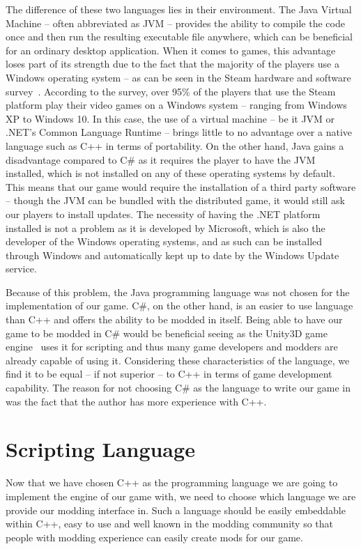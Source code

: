 The difference of these two languages lies in their environment. The Java Virtual Machine -- often abbreviated as JVM -- provides
the ability to compile the code once and then run the resulting executable file anywhere, which can be beneficial for an ordinary
desktop application. When it comes to games, this advantage loses part of its strength due to the fact that the majority of the
players use a Windows operating system -- as can be seen in the Steam hardware and software survey~\cite{SteamHW}. According
to the survey, over 95\% of the players that use the Steam platform  play their video games on a Windows system -- ranging
from Windows XP to Windows 10. In this case, the use of a virtual machine -- be it JVM or .NET's Common Language Runtime -- brings
little to no advantage over a native language such as C++ in terms of portability. On the other hand, Java gains a disadvantage
compared to C\# as it requires the player to have the JVM installed, which is not installed on any of these operating systems
by default. This means that our game would require the installation of a third party software -- though the JVM can be bundled
with the distributed game, it would still ask our players to install updates. The necessity of having the .NET platform
installed is not a problem as it is developed by Microsoft,
which is also the developer of the Windows operating systems, and as such can be installed through Windows and automatically kept
up to date by the Windows Update service.

Because of this problem, the Java programming language was not chosen for the implementation of our game. C\#, on the other hand,
is an easier to use language than C++ and offers the ability to be modded in itself. Being able to have our game to be modded
in C\# would be beneficial seeing as the Unity3D game engine~\cite{Unity} uses it for scripting and thus many game developers
and modders are already capable of using it. Considering these characteristics of the language, we find it to be equal -- if not
superior -- to C++ in terms of game development capability. The reason for not choosing C\# as the language to write our game in
was the fact that the author has more experience with C++.

\section{Scripting Language}

Now that we have chosen C++ as the programming language we are going to implement the engine of our game with, we need
to choose which language we are provide our modding interface in. Such a language should be easily embeddable within C++,
easy to use and well known in the modding community so that people with modding experience can easily create mods for our game.

